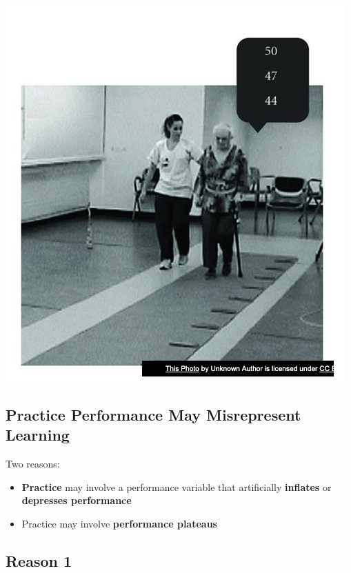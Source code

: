 \documentclass[
  letterpaper,
  DIV=11,
  numbers=noendperiod]{scrartcl}
\providecommand{\tightlist}{%
  \setlength{\itemsep}{0pt}\setlength{\parskip}{0pt}}\usepackage{longtable,booktabs,array}
\begin{document}
\includegraphics{images/Screenshot 2023-09-11 at 11.40.45 AM.png}

\hypertarget{practice-performance-may-misrepresent-learning}{%
\subsection{\texorpdfstring{\textbf{Practice Performance May
Misrepresent
Learning}\hspace{0pt}}{Practice Performance May Misrepresent Learning\hspace{0pt}}}\label{practice-performance-may-misrepresent-learning}}

Two reasons:\hspace{0pt}

\begin{itemize}
\tightlist
\item
  \textbf{Practice} may involve a performance variable that artificially
  \textbf{inflates} or \textbf{depresses performance}\hspace{0pt}
\item
  Practice may involve \textbf{performance plateaus}
\end{itemize}

\hypertarget{reason-1}{%
\subsection{Reason 1}\label{reason-1}}
\end{document}
